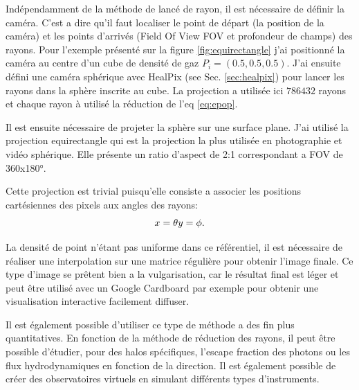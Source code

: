 Indépendamment de la méthode de lancé de rayon, il est nécessaire de définir la caméra.
C'est a dire qu'il faut localiser le point de départ (la position de la caméra) et les points d'arrivés (Field Of View FOV et profondeur de champs) des rayons.
Pour l'exemple présenté sur la figure \ref{fig:equirectangle} j'ai positionné la caméra au centre d'un cube de densité de gaz $P_i = (0.5,0.5,0.5)$.
J'ai ensuite défini une caméra sphérique avec HealPix (see Sec. \ref{sec:healpix}) pour lancer les rayons dans la sphère inscrite au cube.
La projection a utilisée ici $786432$ rayons et chaque rayon à utilisé la réduction de l'eq \ref{eq:epop}.

Il est ensuite nécessaire de projeter la sphère sur une surface plane.
J'ai utilisé la projection equirectangle qui est la projection la plus utilisée en photographie et vidéo sphérique.
Elle présente un ratio d'aspect de 2:1 correspondant a FOV de 360x180°.

Cette projection est trivial puisqu'elle consiste a associer les positions cartésiennes des pixels aux angles des rayons:
\begin{equation}
x=\theta\\
y=\phi.
\end{equation}

La densité de point n’étant pas uniforme dans ce référentiel, il est nécessaire de réaliser une interpolation sur une matrice régulière pour obtenir l'image finale.
Ce type d'image se prêtent bien a la vulgarisation, car le résultat final est léger et peut être utilisé avec un Google Cardboard par exemple pour obtenir une visualisation interactive facilement diffuser.

Il est également possible d'utiliser ce type de méthode a des fin plus quantitatives.
En fonction de la méthode de réduction des rayons, il peut être possible d'étudier, pour des halos spécifiques, l'escape fraction des photons ou les flux hydrodynamiques en fonction de la direction. 
Il est également possible de créer des observatoires virtuels en simulant différents types d'instruments.


